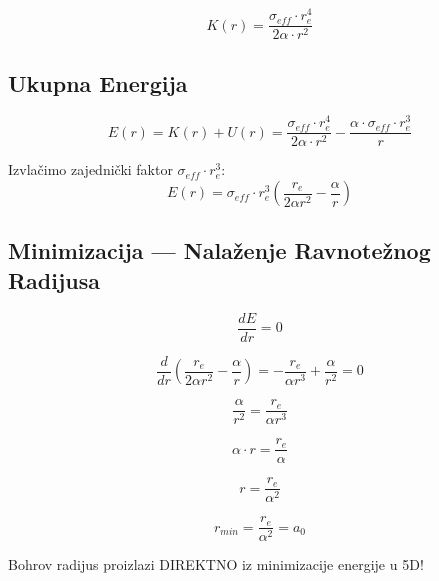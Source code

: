 \documentclass[12pt,a4paper]{article}
\begin{document}
\begin{equation}
\boxed{K(r) = \frac{\sigma_{eff} \cdot r_e^4}{2\alpha \cdot r^2}}
\end{equation}

\subsection{Ukupna Energija}

\begin{equation}
E(r) = K(r) + U(r) = \frac{\sigma_{eff} \cdot r_e^4}{2\alpha \cdot r^2} - \frac{\alpha \cdot \sigma_{eff} \cdot r_e^3}{r}
\end{equation}

Izvlačimo zajednički faktor $\sigma_{eff} \cdot r_e^3$:
\begin{equation}
E(r) = \sigma_{eff} \cdot r_e^3 \left( \frac{r_e}{2\alpha r^2} - \frac{\alpha}{r} \right)
\end{equation}

\subsection{Minimizacija — Nalaženje Ravnotežnog Radijusa}

\begin{equation}
\frac{dE}{dr} = 0
\end{equation}

\begin{equation}
\frac{d}{dr} \left( \frac{r_e}{2\alpha r^2} - \frac{\alpha}{r} \right) = -\frac{r_e}{\alpha r^3} + \frac{\alpha}{r^2} = 0
\end{equation}

\begin{equation}
\frac{\alpha}{r^2} = \frac{r_e}{\alpha r^3}
\end{equation}

\begin{equation}
\alpha \cdot r = \frac{r_e}{\alpha}
\end{equation}

\begin{equation}
r = \frac{r_e}{\alpha^2}
\end{equation}

\begin{keyresult}
\begin{equation}
\boxed{r_{min} = \frac{r_e}{\alpha^2} = a_0}
\end{equation}

Bohrov radijus proizlazi DIREKTNO iz minimizacije energije u 5D!
\end{keyresult}
\end{document}
